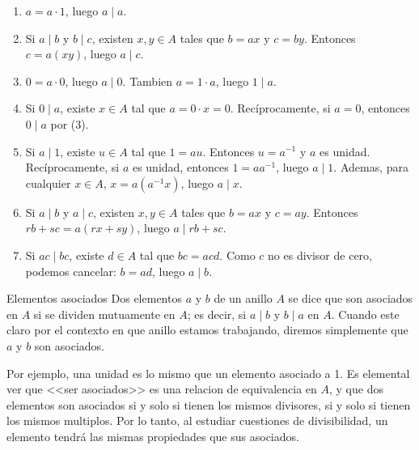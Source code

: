 \begin{proofbox}
\begin{enumerate}
\item \(a = a \cdot 1\), luego \(a \mid a\).

\item Si \(a \mid b\) y \(b \mid c\), existen \(x, y \in A\) tales que \(b = ax\) y \(c = by\). Entonces \(c = a(xy)\), luego \(a \mid c\).

\item \(0 = a \cdot 0\), luego \(a \mid 0\). Tambien \(a = 1 \cdot a\), luego \(1 \mid a\).

\item Si \(0 \mid a\), existe \(x \in A\) tal que \(a = 0 \cdot x = 0\). Recíprocamente, si \(a = 0\), entonces \(0 \mid a\) por (3).

\item Si \(a \mid 1\), existe \(u \in A\) tal que \(1 = au\). Entonces \(u = a^{-1}\) y \(a\) es unidad. Recíprocamente, si \(a\) es unidad, entonces \(1 = a a^{-1}\), luego \(a \mid 1\). Ademas, para cualquier \(x \in A\), \(x = a(a^{-1}x)\), luego \(a \mid x\).

\item Si \(a \mid b\) y \(a \mid c\), existen \(x, y \in A\) tales que \(b = ax\) y \(c = ay\). Entonces \(rb + sc = a(rx + sy)\), luego \(a \mid rb + sc\).

\item Si \(ac \mid bc\), existe \(d \in A\) tal que \(bc = acd\). Como \(c\) no es divisor de cero, podemos cancelar: \(b = ad\), luego \(a \mid b\).
\end{enumerate}
\end{proofbox}

\begin{definition}{Elementos asociados}{}
Dos elementos \(a\) y \(b\) de un anillo \(A\) se dice que son asociados en \(A\) si se dividen mutuamente en \(A\); es decir, si \(a \mid b\) y \(b \mid a\) en \(A\). Cuando este claro por el contexto en que anillo estamos trabajando, diremos simplemente que \(a\) y \(b\) son asociados.
\end{definition}

Por ejemplo, una unidad es lo mismo que un elemento asociado a 1.
Es elemental ver que <<ser asociados>> es una relacion de equivalencia en \(A\), y que dos elementos son asociados si y solo si tienen los mismos divisores, si y solo si tienen los mismos multiplos. Por lo tanto, al estudiar cuestiones de divisibilidad, un elemento tendrá las mismas propiedades que sus asociados.

